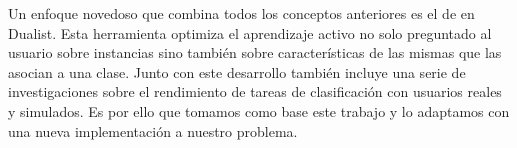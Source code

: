 Un enfoque novedoso que combina todos los conceptos anteriores es el de \citet{dualist} en Dualist. Esta herramienta optimiza el aprendizaje activo no solo preguntado al usuario sobre instancias sino también sobre características de las mismas que las asocian a una clase. Junto con este desarrollo también incluye una serie de investigaciones sobre el rendimiento de tareas de clasificación con usuarios reales y simulados. Es por ello que tomamos como base este trabajo y lo adaptamos con una nueva implementación a nuestro problema.
